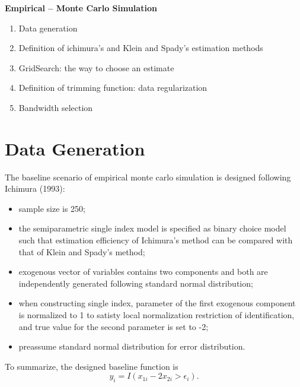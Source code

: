 \documentclass[11pt, a4paper, leqno]{article}
\begin{document}
\textbf{Empirical -- Monte Carlo Simulation}
\begin{enumerate}
\item Data generation
\item Definition of ichimura's and Klein and Spady's estimation methods
\item GridSearch: the way to choose an estimate
\item Definition of trimming function: data regularization
\item Bandwidth selection


\end{enumerate}
\section{Data Generation}
The baseline scenario of empirical monte carlo simulation is designed following Ichimura (1993): 
\begin{itemize}
\item sample size is 250;
\item the semiparametric single index model is specified as binary choice model such that estimation efficiency of Ichimura's method can be compared with that of Klein and Spady's method;
\item exogenous vector of variables contains two components and both are independently generated following standard normal distribution;
\item when constructing single index, parameter of the first exogenous component is normalized to 1 to satisty local normalization restriction of identification, and true value for the second parameter is set to -2;
\item preassume standard normal distribution for error distribution.
\end{itemize}
To summarize, the designed baseline function is
\begin{equation*}
y_i = I(x_{1i} - 2x_{2i} > \epsilon_i).
\end{equation*}
\end{document}
